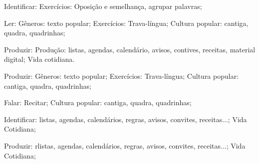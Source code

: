 Identificar: Exercícios: Oposição e semelhança, agrupar palavras;

 Ler: Gêneros: texto popular; Exercícios: Trava-língua; Cultura popular: cantiga, quadra, quadrinhas;

 Produzir: Produção: listas, agendas, calendário, avisos, contives, receitas, material digital; Vida cotidiana.

 Produzir: Gêneros: texto popular; Exercícios: Trava-língua; Cultura popular: cantiga, quadra, quadrinhas;

 Falar: Recitar; Cultura popular: cantiga, quadra, quadrinhas;

 Identificar: listas, agendas, calendários, regras, avisos, convites, receitas...; Vida Cotidiana;

 Produzir: rlistas, agendas, calendários, regras, avisos, convites, receitas...; Vida Cotidiana;

